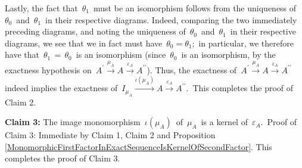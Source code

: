 \begin{enumerate}
	\begin{center}
	\end{center}
	Lastly, the fact that \,$\theta_{1}$\, must be an isomorphism follows from the uniqueness of
	\,$\theta_{0}$\, and \,$\theta_{1}$\, in their respective diagrams.
	Indeed, comparing the two immediately preceding diagrams, and noting the uniqueness of
	\,$\theta_{0}$\, and \,$\theta_{1}$\, in their respective diagrams,
	we see that we in fact must have \,$\theta_{0} = \theta_{1}$;\,
	in particular, we therefore have that \,$\theta_{1} \,=\, \theta_{0}$\, is an isomorphism
	(since \,$\theta_{0}$\, is an isomorphism, by the exactness hypothesis on
	\,$A^{\prime} \overset{\mu_{A}}{\longrightarrow} A \overset{\varepsilon_{A}}{\longrightarrow} A^{\prime\prime}$).
	Thus, the exactness of
	\,$A^{\prime} \overset{\mu_{A}}{\longrightarrow} A \overset{\varepsilon_{A}}{\longrightarrow} A^{\prime\prime}$\,
	indeed implies the exactness of
	\,$I_{\mu_{A}} \overset{\iota(\mu_{A})}{\longrightarrow} A \overset{\varepsilon_{A}}{\longrightarrow} A^{\prime\prime}$.\,
	This completes the proof of Claim 2.	


	\vskip 0.3cm
	\textbf{Claim 3:}\;
	The image monomorphism \,$\iota(\mu_{A})$\, of \,$\mu_{A}$\, is a kernel of \,$\varepsilon_{A}$.\,
	\vskip 0.01cm
	Proof of Claim 3:\;
	Immediate by Claim 1, Claim 2 and
	Proposition \ref{MonomorphicFirstFactorInExactSequenceIsKernelOfSecondFactor}.
	This completes the proof of Claim 3.


\end{enumerate}
